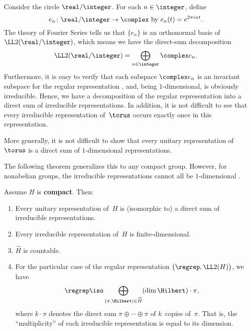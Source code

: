 \begin{eg} \label{FourierSeriesEg}
Consider the circle $\real/\integer$. For each $n \in \integer$, define
	$$ \text{$e_n \colon \real/\integer \to \complex$ by $e_n(t) = e^{2\pi i n t}$} .$$
The theory of Fourier Series tells us that $\{e_n\}$ is an orthonormal basis of $\LL2(\real/\integer)$, which means we have the direct-sum decomposition
	$$ \LL2(\real/\integer) = \bigoplus_{n \in \integer} \complex e_n . $$
Furthermore, it is easy to verify that each subspace $\complex e_n$ is an invariant subspace for the regular representation , and, being $1$-dimensional, is obviously irreducible. Hence, we have a decomposition of the regular representation into a direct sum of irreducible representations. In addition, it is not difficult to see that every irreducible representation of~$\torus$ occurs exactly once in this representation.

More generally, it is not difficult to show that every unitary representation of~$\torus$ is a direct sum of $1$-dimensional representations.
\end{eg}

The following theorem generalizes this to any compact group. However, for nonabelian groups, the irreducible representations cannot all be $1$-dimensional .

\begin{thm} \label{PeterWeyl}
Assume $H$ is \textbf{compact}. Then:
	\begin{enumerate}
	\item \label{PeterWeyl-sum}
	Every unitary representation of~$H$ is\/ \textup(isomorphic to\/\textup) a direct sum of irreducible representations.
	\item \label{PeterWeyl-fd}
	Every irreducible representation of~$H$ is finite-dimensional. 
	\item \label{PeterWeyl-countable}
	$\widehat H$ is countable.
	\item \label{PeterWeyl-regrep}
	For the particular case of the regular representation $\bigl(\regrep, \LL2(H) \bigr)$, we have
		$$\regrep \iso \bigoplus_{(\pi,\Hilbert) \in \widehat H} (\dim \Hilbert) \cdot \pi , $$
	where $k \cdot \pi$ denotes the direct sum $\pi \oplus \cdots \oplus \pi$ of $k$~copies of\/~$\pi$. That is, the ``multiplicity'' of each irreducible representation is equal to its dimension.
	\end{enumerate}
\end{thm}

